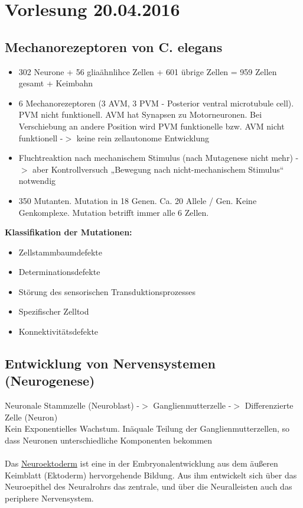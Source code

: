 \section{Vorlesung 20.04.2016}

\subsection{Mechanorezeptoren von C. elegans}
\begin{itemize}
	\item 302 Neurone + 56 gliaähnlihce Zellen + 601 übrige Zellen = 959 Zellen gesamt + Keimbahn
	\item 6 Mechanorezeptoren (3 AVM, 3 PVM - Posterior ventral microtubule cell). PVM nicht funktionell. AVM hat Synapsen zu Motorneuronen. Bei Verschiebung an andere Position wird PVM funktionelle bzw. AVM nicht funktionell -$>$ keine rein zellautonome Entwicklung
	\item Fluchtreaktion nach mechanischem Stimulus (nach Mutagenese nicht mehr) -$>$ aber Kontrollversuch „Bewegung nach nicht-mechanischem Stimulus“ notwendig
	\item 350 Mutanten. Mutation in 18 Genen. Ca. 20 Allele / Gen. Keine Genkomplexe. Mutation betrifft immer alle 6 Zellen.
\end{itemize}

\textbf{Klassifikation der Mutationen:}
\begin{itemize}
	\item Zellstammbaumdefekte
	\item Determinationsdefekte
	\item Störung des sensorischen Transduktionsprozesses
	\item Spezifischer Zelltod
	\item Konnektivitätsdefekte
\end{itemize}

\subsection{Entwicklung von Nervensystemen (Neurogenese)}
Neuronale Stammzelle (Neuroblast) -$>$ Ganglienmutterzelle -$>$ Differenzierte Zelle (Neuron)\\
Kein Exponentielles Wachstum. Inäquale Teilung der Ganglienmutterzellen, so dass Neuronen unterschiedliche Komponenten bekommen\\
\\
Das \underline{Neuroektoderm} ist eine in der Embryonalentwicklung aus dem äußeren Keimblatt (Ektoderm) hervorgehende Bildung. Aus ihm entwickelt sich über das Neuroepithel des Neuralrohrs das zentrale, und über die Neuralleisten auch das periphere Nervensystem.\\

